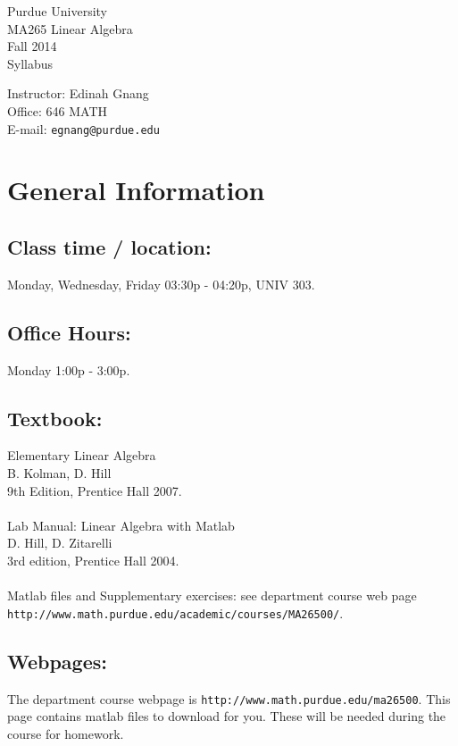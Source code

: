 \documentclass[10pt]{article}
\begin{document}
\noindent\parbox{7cm}{\large Purdue University\\
                    MA265 Linear Algebra\\
                    Fall 2014\\
                    Syllabus}
\hfill
\parbox{7cm}{\large Instructor: Edinah Gnang\\
                    Office: 646 MATH\\
                    E-mail: {\tt egnang@purdue.edu}}

\section{General Information}

\subsection{Class time / location:}
        Monday, Wednesday, Friday 03:30p - 04:20p, UNIV 303.

\subsection{Office Hours:}   
                Monday 1:00p - 3:00p.	

\subsection{Textbook:}
                Elementary Linear Algebra\\
                B. Kolman, D. Hill\\
		9th Edition, Prentice Hall 2007.\\
\\
                Lab Manual: Linear Algebra with Matlab\\
		D. Hill, D. Zitarelli\\
		3rd edition, Prentice Hall 2004.\\
\\
                Matlab files and Supplementary exercises: see
                department course web page {\tt http://www.math.purdue.edu/academic/courses/MA26500/}.
\subsection{Webpages:}
\noindent The department course webpage is {\tt http://www.math.purdue.edu/ma26500}. \smallskip
This page contains matlab files to
download for you. These will be needed during the course for
homework.\smallskip
\end{document}
